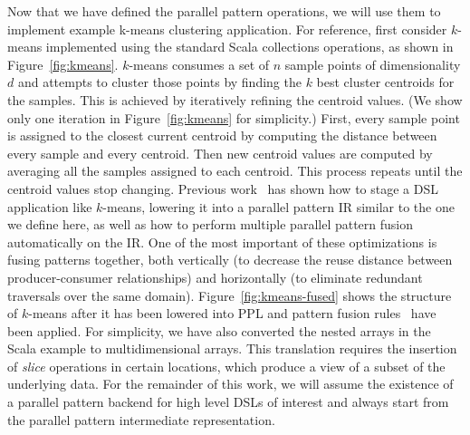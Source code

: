 Now that we have defined the parallel pattern operations, we will use them to
implement example k-means clustering application.
For reference, first consider $k$-means implemented using the standard Scala
collections operations, as shown in Figure~\ref{fig:kmeans}.
$k$-means consumes a set of $n$ sample points of dimensionality $d$ and
attempts to cluster those points by finding the $k$ best cluster centroids for the samples.
This is achieved by iteratively refining the centroid values.
(We show only one iteration in Figure~\ref{fig:kmeans} for simplicity.)
First, every sample point is assigned to the closest current centroid by
computing the distance between every sample and every centroid.
Then new centroid values are computed by averaging all the samples assigned to each centroid.
This process repeats until the centroid values stop changing.
Previous work~\cite{rompf12optimizing,brown16clusters,chambers10flumejava} has shown how to stage a DSL application like $k$-means, lowering it into a parallel pattern IR similar to the one we define here, as well as how to perform multiple parallel pattern fusion automatically on the IR.
One of the most important of these optimizations is fusing patterns together, both vertically (to decrease the reuse distance between producer-consumer relationships) and horizontally (to eliminate redundant traversals over the same domain).
Figure~\ref{fig:kmeans-fused} shows the structure of $k$-means after it has been lowered into PPL and pattern fusion rules~\cite{rompf12optimizing} have been applied.
For simplicity, we have also converted the nested arrays in the Scala example to multidimensional arrays.
This translation requires the insertion of \emph{slice} operations in certain locations, which produce a view of a subset of the underlying data.
For the remainder of this work, we will assume the existence of a parallel pattern backend
for high level DSLs of interest and always start from the parallel pattern intermediate representation.

%
